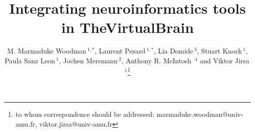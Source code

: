 \documentclass{bioinfo}
\begin{document}


\title[TVB]{Integrating neuroinformatics tools in TheVirtualBrain}
\author[Woodman {et~al}]{
        M. Marmaduke Woodman\,$^{1,*}$,  
        Laurent Pezard\,$^{1,*}$,  
        Lia Domide\,$^{3}$, 
        Stuart Knock\,$^{1}$, 
        Paula Sanz Leon\,$^{1}$, 
        Jochen Mersmann\,$^{2}$,
        Anthony R. McIntosh \,$^{4}$ and  
        Viktor Jirsa\,$^{1}$\footnote{to whom correspondence should be addressed: marmaduke.woodman@univ-amu.fr,
        viktor.jirsa@univ-amu.fr}}

\address{$^{1}$ Institut de Neurosciences des Syst{\`e}mes, 27, Bd. Jean Moulin, 13005, Marseille, France.\\
         $^{3}$ Codemart, 13, Petofi Sandor, 400610, Cluj-Napoca, Romania.\\
         $^{2}$ CodeBox GmbH, Hugo Eckener Str. 7, 70184 Stuttgart, Germany.\\
         $^{4}$ Rotman Research Institute at Baycrest, Toronto, M6A 2E1, Ontario, Canada\\
        }

\history{}

\editor{}

\maketitle

\end{document}
